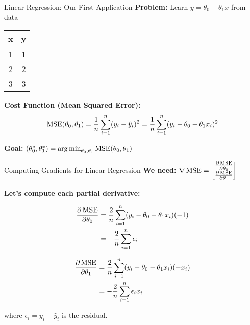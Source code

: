 \documentclass[usenames,dvipsnames]{beamer}
\begin{document}
  \begin{frame}{Linear Regression: Our First Application}
    \textbf{Problem:} Learn $y = \theta_0 + \theta_1 x$ from data
    
    \begin{center}
    \begin{tabular}{|c|c|}
        \hline
        \textbf{x} & \textbf{y} \\
        \hline
        1 & 1 \\
        2 & 2 \\
        3 & 3 \\
        \hline
    \end{tabular}
    \end{center}
    
    \pause
    \textbf{Cost Function (Mean Squared Error):}
    $$\operatorname{MSE}(\theta_0, \theta_1) = \frac{1}{n}\sum_{i=1}^n (y_i - \hat{y}_i)^2 = \frac{1}{n}\sum_{i=1}^n (y_i - \theta_0 - \theta_1 x_i)^2$$
    
    \pause
    \textbf{Goal:} $(\theta_0^*, \theta_1^*) = \operatorname*{arg\,min}_{\theta_0, \theta_1} \operatorname{MSE}(\theta_0, \theta_1)$
  \end{frame}

  \begin{frame}{Computing Gradients for Linear Regression}
    \textbf{We need:} $\nabla \operatorname{MSE} = \begin{bmatrix} \frac{\partial \operatorname{MSE}}{\partial \theta_0} \\ \frac{\partial \operatorname{MSE}}{\partial \theta_1} \end{bmatrix}$
    
    \pause
    \textbf{Let's compute each partial derivative:}
    
    \begin{align}
        \frac{\partial \operatorname{MSE}}{\partial \theta_0} &= \frac{2}{n}\sum_{i=1}^n (y_i - \theta_0 - \theta_1 x_i)(-1)\\
        &= -\frac{2}{n}\sum_{i=1}^n \epsilon_i
    \end{align}
    
    \pause
    \begin{align}
        \frac{\partial \operatorname{MSE}}{\partial \theta_1} &= \frac{2}{n}\sum_{i=1}^n (y_i - \theta_0 - \theta_1 x_i)(-x_i)\\
        &= -\frac{2}{n}\sum_{i=1}^n \epsilon_i x_i
    \end{align}
    
    where $\epsilon_i = y_i - \hat{y}_i$ is the residual.
  \end{frame}
\end{document}
